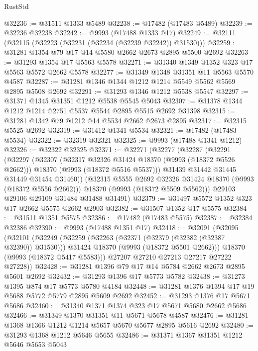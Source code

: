 \begin{lexlean}{RustStd}
\begin{coremodule}
@32236 := @31511 @1333 @5489
@32238 := @17482 (@17483 @5489)
@32239 := @32236 @32238
@32242 := @9993 (@17488 @1333 @17)
@32249 := @32111 (@32115 (@32223 (@32231 (@32234 (@32239 @32242)) @31530)))
@32259 := @31281 @1354 @79 @17 @14 @5580 @2662 @2673 @2895 @5500 @2692
@32263 := @31293 @1354 @17 @5563 @5578
@32271 := @31340 @1349 @1352 @323 @17 @5563 @5572 @2662 @5578
@32277 := @31349 @1348 @31351 @11 @5563 @5570 @4587
@32287 := @31281 @1346 @1344 @1212 @1214 @5549 @5562 @5569 @2895 @5508 @2692
@32291 := @31293 @1346 @1212 @5538 @5547
@32297 := @31371 @1345 @31351 @1212 @5538 @5545 @5043
@32307 := @31378 @1344 @1212 @1214 @2751 @5537 @5544 @2895 @5515 @2692 @31398
@32315 := @31281 @1342 @79 @1212 @14 @5534 @2662 @2673 @2895
@32317 := @32315 @5525 @2692
@32319 := @31412 @1341 @5534
@32321 := @17482 (@17483 @5534)
@32322 := @32319 @32321
@32325 := @9993 (@17488 @1341 @1212)
@32326 := @32322 @32325
@32371 := @32271
    (@32277
      (@32287
        (@32291
          (@32297
            (@32307
              (@32317 @32326 @31424 @18370 (@9993 (@18372 @5526 @2662)))
              @18370
              (@9993 (@18372 @5516 @5537)))
            @31439
            @31442
            @31445
            @31449
            @31454
            @31460))
        (@32315 @5555 @2692 @32326 @31424 @18370 (@9993 (@18372 @5556 @2662)))
        @18370
        (@9993 (@18372 @5509 @5562)))
      @29103
      @29106
      @29109
      @31484
      @31488
      @31491)
@32379 := @31497 @5572 @1352 @323 @17 @2662 @5575 @2662 @2903
@32382 := @31507 @1352 @17 @5575
@32384 := @31511 @1351 @5575
@32386 := @17482 (@17483 @5575)
@32387 := @32384 @32386
@32390 := @9993 (@17488 @1351 @17)
@32418 := @32091
    (@32095
      (@32101
        (@32249
          (@32259
            (@32263 (@32371 (@32379 (@32382 (@32387 @32390)) @31530)))
            @31424
            @18370
            (@9993 (@18372 @5501 @2662)))
          @18370
          (@9993 (@18372 @5417 @5583)))
        @27207
        @27210
        @27213
        @27217
        @27222
        @27228))
@32428 := @31281 @1396 @79 @17 @14 @5784 @2662 @2673 @2895 @5601 @2692
@32432 := @31293 @1396 @17 @5773 @5782
@32438 := @31273 @1395 @874 @17 @5773 @5780 @4184
@32448 := @31281 @1376 @1394 @17 @19 @5688 @5772 @5779 @2895 @5609 @2692
@32452 := @31293 @1376 @17 @5671 @5686
@32460 := @31340 @1371 @1374 @323 @17 @5671 @5680 @2662 @5686
@32466 := @31349 @1370 @31351 @11 @5671 @5678 @4587
@32476 := @31281 @1368 @1366 @1212 @1214 @5657 @5670 @5677 @2895 @5616 @2692
@32480 := @31293 @1368 @1212 @5646 @5655
@32486 := @31371 @1367 @31351 @1212 @5646 @5653 @5043

\end{coremodule}
\end{lexlean}
